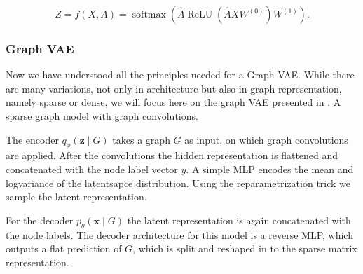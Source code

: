 \begin{equation}
    Z=f(X, A)=\operatorname{softmax}\left(\hat{A} \operatorname{ReLU}\left(\hat{A} X W^{(0)}\right) W^{(1)}\right).
\end{equation}




\subsubsection{Graph VAE}
\label{ssec:GVAE}

Now we have understood all the principles needed for a Graph VAE. While there are many variations, not only in architecture but also in graph representation, namely sparse or dense, we will focus here on the graph VAE presented in \cite{simonovsky_graphvae_2018}. A sparse graph model with graph convolutions.

The encoder $q_{\phi}(\mathbf{z} \mid {G})$ takes a graph ${G}$ as input, on which graph convolutions are applied. After the convolutions the hidden representation is flattened and concatenated with the node label vector $y$. A simple MLP encodes the mean and logvariance of the latentsapce distribution. Using the reparametrization trick we sample the latent representation.

For the decoder $p_{\theta}(\mathbf{x} \mid {G})$ the latent representation is again concatenated with the node labels. The decoder architecture for this model is a reverse MLP, which outputs a flat prediction of ${G}$, which is split and reshaped in to the sparse matrix representation.


